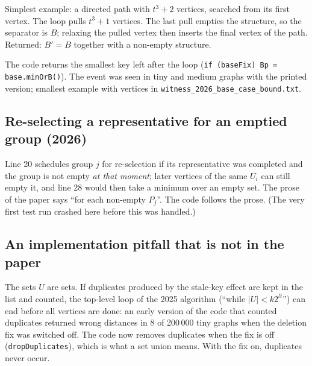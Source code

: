 \documentclass[11pt,a4paper]{article}
\newcommand{\code}[1]{\texttt{#1}}
\begin{document}
Simplest example: a directed path with $t^3+2$ vertices, searched from its first vertex. The loop pulls $t^3+1$ vertices. The last pull empties the structure, so the separator is $B$; relaxing the pulled vertex then inserts the final vertex of the path. Returned: $B'=B$ together with a non-empty structure.

The code returns the smallest key left after the loop (\code{if (baseFix) Bp = base.minOrB()}). The event was seen in \ValSmallBoundTwoSix{} tiny and \ValMediumBoundTwoSix{} medium graphs with the printed version; smallest example with \ValMinNBoundTwoSix{} vertices in \code{witness\_2026\_base\_case\_bound.txt}.

\subsection{Re-selecting a representative for an emptied group (2026)}
Line 20 schedules group $j$ for re-selection if its representative was completed and the group is not empty \emph{at that moment}; later vertices of the same $U_i$ can still empty it, and line 28 would then take a minimum over an empty set. The prose of the paper says ``for each non-empty $P_j$''. The code follows the prose. (The very first test run crashed here before this was handled.)

\subsection{An implementation pitfall that is not in the paper}
The sets $U$ are sets. If duplicates produced by the stale-key effect are kept in the list and counted, the top-level loop of the 2025 algorithm (``while $|U|<k2^{lt}$'') can end before all vertices are done: an early version of the code that counted duplicates returned wrong distances in 8 of 200\,000 tiny graphs when the deletion fix was switched off. The code now removes duplicates when the fix is off (\code{dropDuplicates}), which is what a set union means. With the fix on, duplicates never occur.
\end{document}
